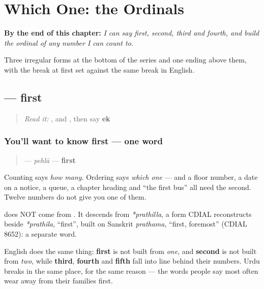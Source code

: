 
\chapter{Which One: the Ordinals}
\label{ch:ur-ordinals}

\begin{chapteropening}
\textbf{By the end of this chapter:} \emph{I can say first, second, third and fourth, and build the ordinal of any number I can count to.}

Three irregular forms at the bottom of the series and one ending above them, with the break at first set against the same break in English.
\end{chapteropening}

\section[\texorpdfstring{\ur{پہلا} (pehlā)}{پہلا (pehlā)}]{ — first}

\label{lesson:UR-C32-pehla}



\begin{quote}
\emph{Read it:} \textbf{}, \textbf{} and \textbf{}, then say \textbf{ek}
\end{quote}

\subsection*{You'll want to know first — one word}
\begin{quote}
\textbf{} — \emph{pehlā} — \textbf{first}
\end{quote}

Counting says \emph{how many}. Ordering says \emph{which one} — and a floor number, a date on a notice, a queue, a chapter heading and \textquotedblleft{}the first bus\textquotedblright{} all need the second. Twelve numbers do not give you one of them.

\begin{cousinweb}
\textbf{} does NOT come from \textbf{}. It descends from \emph{*prathilla}, a form CDIAL reconstructs beside \emph{*prathila}, \textquotedblleft{}first\textquotedblright{}, built on Sanskrit \emph{prathama}, \textquotedblleft{}first, foremost\textquotedblright{} (CDIAL 8652): a separate word.

English does the same thing: \textbf{first} is not built from \emph{one}, and \textbf{second} is not built from \emph{two}, while \textbf{third}, \textbf{fourth} and \textbf{fifth} fall into line behind their numbers. Urdu breaks in the same place, for the same reason — the words people say most often wear away from their families first.
\end{cousinweb}


